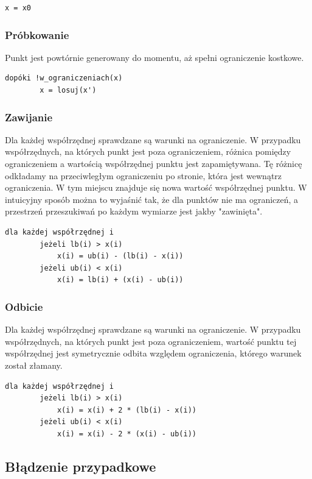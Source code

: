 \documentclass{mini}
\begin{document}
\begin{Verbatim}[baselinestretch=1.1]
	x = x0
\end{Verbatim}

\subsubsection{Próbkowanie}
Punkt jest powtórnie generowany do momentu, aż spełni ograniczenie kostkowe.

\begin{Verbatim}[baselinestretch=1.1]
	dopóki !w_ograniczeniach(x)
		x = losuj(x')
\end{Verbatim}

\subsubsection{Zawijanie}
Dla każdej współrzędnej sprawdzane są warunki na ograniczenie. W przypadku współrzędnych, na których punkt jest poza ograniczeniem, różnica pomiędzy ograniczeniem a wartością współrzędnej punktu jest zapamiętywana. Tę różnicę odkładamy na przeciwległym ograniczeniu po stronie, która jest wewnątrz ograniczenia. W tym miejscu znajduje się nowa wartość współrzędnej punktu. W intuicyjny sposób można to wyjaśnić tak, że dla punktów nie ma ograniczeń, a przestrzeń przeszukiwań po każdym wymiarze jest jakby "zawinięta".

\begin{Verbatim}[baselinestretch=1.1]
	dla każdej współrzędnej i
		jeżeli lb(i) > x(i)
			x(i) = ub(i) - (lb(i) - x(i))
		jeżeli ub(i) < x(i)
			x(i) = lb(i) + (x(i) - ub(i))
\end{Verbatim}

\subsubsection{Odbicie}
Dla każdej współrzędnej sprawdzane są warunki na ograniczenie. W przypadku współrzędnych, na których punkt jest poza ograniczeniem, wartość punktu tej współrzędnej jest symetrycznie odbita względem ograniczenia, którego warunek został złamany.

\begin{Verbatim}[baselinestretch=1.1]
	dla każdej współrzędnej i
		jeżeli lb(i) > x(i)
			x(i) = x(i) + 2 * (lb(i) - x(i))
		jeżeli ub(i) < x(i)
			x(i) = x(i) - 2 * (x(i) - ub(i))
\end{Verbatim}

\subsection{Błądzenie przypadkowe} \label{bladzenie}
\end{document}

